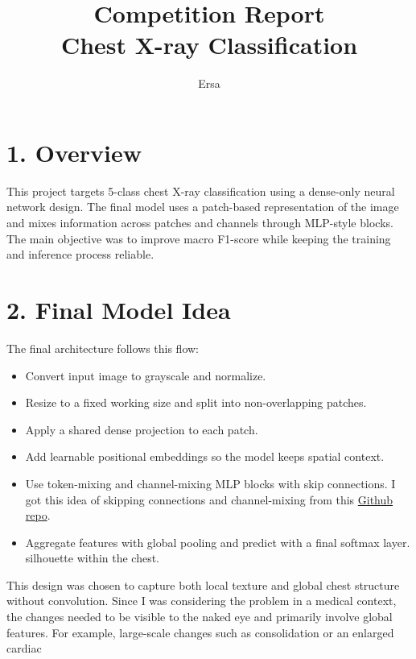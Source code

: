 \documentclass[11pt]{article}
\title{\textbf{Competition Report}\\
Chest X-ray Classification}
\author{Ersa}
\date{}
\begin{document}
\maketitle

\section*{1. Overview}
This project targets 5-class chest X-ray classification using a dense-only neural network design. The final model uses a patch-based representation of the image and mixes information across patches and channels through MLP-style blocks. The main objective was to improve macro F1-score while keeping the training and inference process reliable.

\section*{2. Final Model Idea}
The final architecture follows this flow:
\begin{itemize}[leftmargin=1.2em]
\item Convert input image to grayscale and normalize.
\item Resize to a fixed working size and split into non-overlapping patches.
\item Apply a shared dense projection to each patch.
\item Add learnable positional embeddings so the model keeps spatial context. 
\item Use token-mixing and channel-mixing MLP blocks with skip connections. I got this idea of skipping connections and channel-mixing from this \href{https://github.com/jeonsworld/MLP-Mixer-Pytorch/blob/main/README.md}{Github repo}.
\item Aggregate features with global pooling and predict with a final softmax layer. silhouette within the chest.
\end{itemize}

This design was chosen to capture both local texture and global chest structure without convolution. Since I was considering the problem in a medical context, the changes needed to be visible to the naked eye and primarily involve global features. For example, large-scale changes such as consolidation or an enlarged cardiac 
\end{document}
